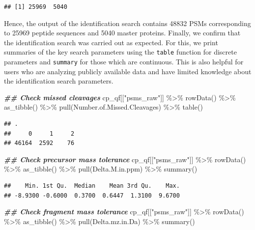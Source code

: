 \documentclass[9pt,a4paper,]{extarticle}
\newenvironment{Shaded}{\begin{snugshade}}{\end{snugshade}}
\newcommand{\DocumentationTok}[1]{\textcolor[rgb]{0.56,0.35,0.01}{\textbf{\textit{#1}}}}
\newcommand{\FunctionTok}[1]{\textcolor[rgb]{0.00,0.00,0.00}{#1}}
\newcommand{\NormalTok}[1]{#1}
\newcommand{\SpecialCharTok}[1]{\textcolor[rgb]{0.00,0.00,0.00}{#1}}
\newcommand{\StringTok}[1]{\textcolor[rgb]{0.31,0.60,0.02}{#1}}
\begin{document}
\begin{verbatim}
## [1] 25969  5040
\end{verbatim}

Hence, the output of the identification search contains
48832 PSMs corresponding to
25969 peptide sequences and
5040 master proteins. Finally, we
confirm that the identification search was carried out as expected. For this, we
print summaries of the key search parameters using the \texttt{table} function for
discrete parameters and \texttt{summary} for those which are continuous. This is also
helpful for users who are analyzing publicly available data and have limited
knowledge about the identification search parameters.

\begin{Shaded}
\begin{Highlighting}[]
\DocumentationTok{\#\# Check missed cleavages}
\NormalTok{cp\_qf[[}\StringTok{"psms\_raw"}\NormalTok{]] }\SpecialCharTok{\%\textgreater{}\%}
  \FunctionTok{rowData}\NormalTok{() }\SpecialCharTok{\%\textgreater{}\%} 
  \FunctionTok{as\_tibble}\NormalTok{() }\SpecialCharTok{\%\textgreater{}\%} 
  \FunctionTok{pull}\NormalTok{(Number.of.Missed.Cleavages) }\SpecialCharTok{\%\textgreater{}\%} 
  \FunctionTok{table}\NormalTok{()}
\end{Highlighting}
\end{Shaded}

\begin{verbatim}
## .
##     0     1     2 
## 46164  2592    76
\end{verbatim}

\begin{Shaded}
\begin{Highlighting}[]
\DocumentationTok{\#\# Check precursor mass tolerance}
\NormalTok{cp\_qf[[}\StringTok{"psms\_raw"}\NormalTok{]] }\SpecialCharTok{\%\textgreater{}\%} 
  \FunctionTok{rowData}\NormalTok{() }\SpecialCharTok{\%\textgreater{}\%} 
  \FunctionTok{as\_tibble}\NormalTok{() }\SpecialCharTok{\%\textgreater{}\%} 
  \FunctionTok{pull}\NormalTok{(Delta.M.in.ppm) }\SpecialCharTok{\%\textgreater{}\%} 
  \FunctionTok{summary}\NormalTok{()}
\end{Highlighting}
\end{Shaded}

\begin{verbatim}
##    Min. 1st Qu.  Median    Mean 3rd Qu.    Max. 
## -8.9300 -0.6000  0.3700  0.6447  1.3100  9.6700
\end{verbatim}

\begin{Shaded}
\begin{Highlighting}[]
\DocumentationTok{\#\# Check fragment mass tolerance}
\NormalTok{cp\_qf[[}\StringTok{"psms\_raw"}\NormalTok{]] }\SpecialCharTok{\%\textgreater{}\%} 
  \FunctionTok{rowData}\NormalTok{() }\SpecialCharTok{\%\textgreater{}\%} 
  \FunctionTok{as\_tibble}\NormalTok{() }\SpecialCharTok{\%\textgreater{}\%} 
  \FunctionTok{pull}\NormalTok{(Delta.mz.in.Da) }\SpecialCharTok{\%\textgreater{}\%} 
  \FunctionTok{summary}\NormalTok{()}
\end{Highlighting}
\end{Shaded}
\end{document}

